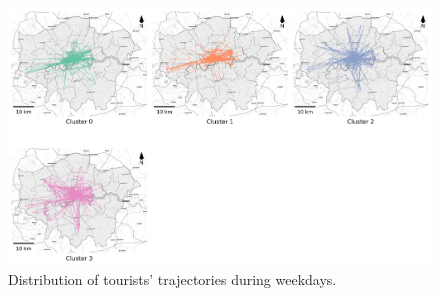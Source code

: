 \documentclass{article}
\theoremstyle{definition}
\theoremstyle{remark}
\begin{document}
\begin{figure}[!h]
\centering
\includegraphics[width=1\textwidth]{figures/traj_distribution_weekday_tourists.png}
\caption{\label{fig:traj_distribution_weekday_tourists}Distribution of tourists' trajectories during weekdays.}
\end{figure}
\end{document}

